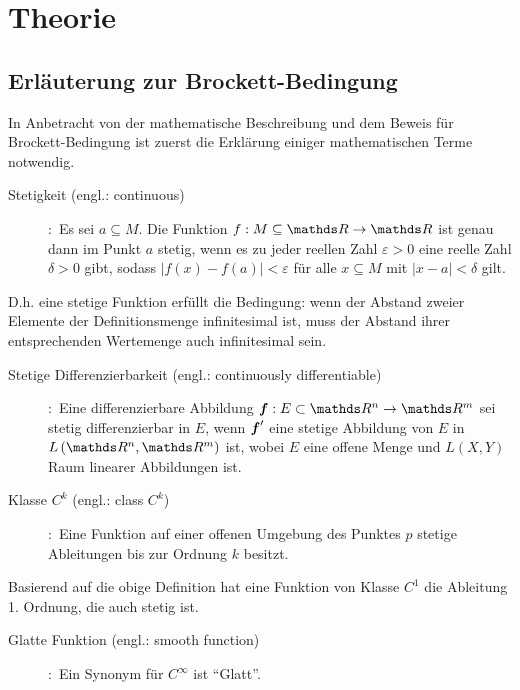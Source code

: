 \chapter{Theorie}
\label{Theorie}
\section{Erläuterung zur Brockett-Bedingung}
\label{Erläuterung zur Brockett-Bedingung}
In Anbetracht von der mathematische Beschreibung und dem Beweis für Brockett-Bedingung ist zuerst die Erklärung einiger mathematischen Terme notwendig.    
\begin{description} 
\item[Stetigkeit (engl.: continuous)]
\cite[S.250]{grosche2003teubner}:~Es sei $a\subseteq M$. Die Funktion $f:M\subseteq\Reals\to\Reals$ ist genau dann im Punkt $a$ stetig, wenn es zu jeder reellen Zahl $\varepsilon>0$ eine reelle Zahl $\delta>0$ gibt, sodass
$\left | f\left ( x \right )-f\left ( a \right ) \right |< \varepsilon$ für alle $x\subseteq M$ mit $\left | x-a \right |< \delta $ gilt.  
\end{description}
\vspace{-0.8em}
D.h. eine stetige Funktion erfüllt die Bedingung: wenn der Abstand zweier Elemente der Definitionsmenge infinitesimal ist, muss der Abstand ihrer entsprechenden Wertemenge auch infinitesimal sein.
\begin{description}
\item[Stetige Differenzierbarkeit (engl.: continuously differentiable)]
\cite[S.256]{rudin2009analysis}:~Eine differenzierbare Abbildung $\vect{f}:E\subset\Reals^{n}\to \Reals^{m}$ sei stetig differenzierbar in $E$, wenn ${\boldsymbol f}'$ eine stetige Abbildung von $E$ in $L\left ( \Reals^{n},\Reals^{m} \right )$ ist, wobei $E$ eine offene Menge und $L\left ( X,Y \right )$ Raum linearer Abbildungen ist.
\item[Klasse $C^{k}$ (engl.: class $C^{k}$)]
\cite[S.265]{grosche2003teubner}:~Eine Funktion auf einer offenen Umgebung des Punktes $p$ stetige Ableitungen bis zur Ordnung $k$ besitzt.
\end{description}
\vspace{-0.8em}
Basierend auf die obige Definition hat eine Funktion von Klasse $C^{1}$ die Ableitung 1. Ordnung, die auch stetig ist.
\begin{description}
\item[Glatte Funktion (engl.: smooth function)]
\cite[S.5]{tu2010introduction}:~Ein Synonym für $C^{\infty}$ ist ``Glatt''.
\end{description}
